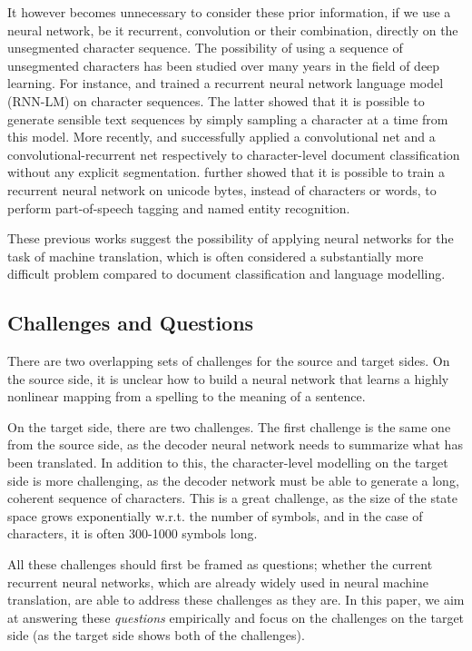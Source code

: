 \documentclass[11pt]{article}
\begin{document}
It however becomes unnecessary to consider these prior information, if we use a
neural network, be it recurrent, convolution or their combination, directly on
the unsegmented character sequence. The possibility of using a sequence of
unsegmented characters has been studied over many years in the field of deep
learning. For instance,  and
 trained a recurrent neural network language
model (RNN-LM) on character sequences. The latter showed that it is possible to
generate sensible text sequences by simply sampling a character at a time from
this model. More recently,  and
 successfully applied a convolutional net and a
convolutional-recurrent net respectively to character-level document
classification without any explicit segmentation.
 further showed that it is possible to
train a recurrent neural network on unicode bytes, instead of characters or words,
 to perform part-of-speech tagging and named entity recognition. 

These previous works suggest the possibility of applying neural networks for the task of machine translation,
which is often considered a substantially more difficult problem compared to
document classification and language modelling.

\subsection{Challenges and Questions}

There are two overlapping sets of challenges for the source and target sides. On
the source side, it is unclear how to build a neural network that learns a
highly nonlinear mapping from a spelling to the meaning of a sentence.  

On the target side, there are two challenges. The first challenge is the same
one from the source side, as the decoder neural network needs to summarize what
has been translated. 
In addition to this, the character-level modelling on the target side is more
challenging, as the decoder network must be able to generate a long, coherent
sequence of characters. This is a great challenge, as the size of the state
space grows exponentially w.r.t. the
number of symbols, and in the case of characters, it is often 300-1000 symbols
long.

All these challenges should first be framed as questions; whether the current
recurrent neural networks, which are already widely used in neural machine
translation, are able to address these challenges as they are. In this paper, we
aim at answering these {\em questions} empirically and focus on the challenges
on the target side (as the target side shows both of the challenges).
\end{document}
